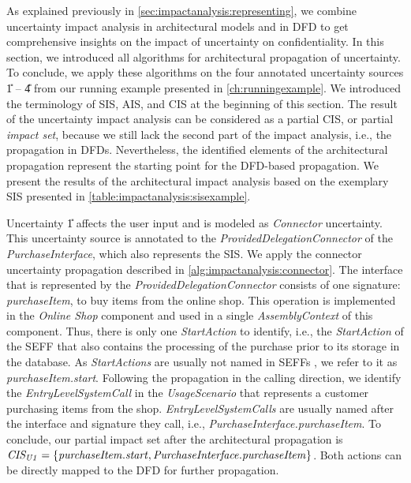 As explained previously in \autoref{sec:impactanalysis:representing}, we combine uncertainty impact analysis in architectural models and in \ac{DFD} to get comprehensive insights on the impact of uncertainty on confidentiality.
In this section, we introduced all algorithms for architectural propagation of uncertainty.
To conclude, we apply these algorithms on the four annotated uncertainty sources \U{1} -- \U{4} from our running example presented in \autoref{ch:runningexample}.
We introduced the terminology of \ac{SIS}, \ac{AIS}, and \ac{CIS} at the beginning of this section.
The result of the uncertainty impact analysis can be considered as a partial \ac{CIS}, or partial \emph{impact set}, because we still lack the second part of the impact analysis, i.e., the propagation in \acp{DFD}.
Nevertheless, the identified elements of the architectural propagation represent the starting point for the \ac{DFD}-based propagation. 
We present the results of the architectural impact analysis based on the exemplary \ac{SIS} presented in \autoref{table:impactanalysis:sisexample}.

Uncertainty \U{1} affects the user input and is modeled as \emph{Connector} uncertainty.
This uncertainty source is annotated to the \emph{ProvidedDelegationConnector} of the \emph{PurchaseInterface}, which also represents the \ac{SIS}.
We apply the connector uncertainty propagation described in \autoref{alg:impactanalysis:connector}.
The interface that is represented by the \emph{ProvidedDelegationConnector} consists of one signature: \emph{purchaseItem}, to buy items from the online shop.
This operation is implemented in the \emph{Online Shop} component and used in a single \emph{AssemblyContext} of this component.
Thus, there is only one \emph{StartAction} to identify, i.e., the \emph{StartAction} of the \ac{SEFF} that also contains the processing of the purchase prior to its storage in the database.
As \emph{StartActions} are usually not named in \acp{SEFF} \cite{reussner_palladio_2024}, we refer to it as \emph{purchaseItem.start}.
Following the propagation in the calling direction, we identify the \emph{EntryLevelSystemCall} in the \emph{UsageScenario} that represents a customer purchasing items from the shop.
\emph{EntryLevelSystemCalls} are usually named after the interface and signature they call, i.e., \emph{PurchaseInterface.purchaseItem}.
To conclude, our partial impact set after the architectural propagation is $\mathit{CIS_{U1}} = \{ \mathit{purchaseItem.start}, \mathit{PurchaseInterface.purchaseItem} \}$.
Both actions can be directly mapped to the \ac{DFD} \cite{seifermann_architectural_2022} for further propagation.


